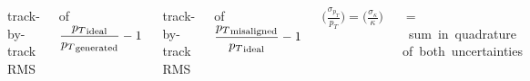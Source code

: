 \documentclass[compress]{beamer}
\begin{document}
\begin{frame}
\begin{columns}
track-by-track RMS

\vspace{0.1 cm}
of $\displaystyle \frac{{p_T}_{\mbox{\scriptsize ideal}}}{{p_T}_{\mbox{\scriptsize generated}}} - 1$

\vspace{0.75 cm}
track-by-track RMS

\vspace{0.1 cm}
of $\displaystyle \frac{{p_T}_{\mbox{\scriptsize misaligned}}}{{p_T}_{\mbox{\scriptsize ideal}}} - 1$

\vspace{1.5 cm}
$\displaystyle \bigg(\frac{\sigma_{p_T}}{p_T}\bigg) = \bigg(\frac{\sigma_\kappa}{\kappa}\bigg)$

\vspace{0.1 cm}
\mbox{$=$ sum in quadrature} \mbox{of both uncertainties}
\end{columns}
\end{frame}
\end{document}

